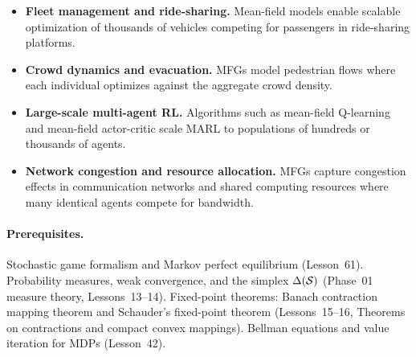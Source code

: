 \documentclass[11pt,a4paper]{article}
\begin{document}
\begin{rlconnection}[title={Why Mean-Field Games Matter for RL/ML}]
\begin{itemize}[nosep]
  \item \textbf{Fleet management and ride-sharing.}  Mean-field
    models enable scalable optimization of thousands of vehicles
    competing for passengers in ride-sharing platforms.
  \item \textbf{Crowd dynamics and evacuation.}  MFGs model
    pedestrian flows where each individual optimizes against the
    aggregate crowd density.
  \item \textbf{Large-scale multi-agent RL.}  Algorithms such as
    mean-field Q-learning \citep{yang2018} and mean-field
    actor-critic \citep{gu2021} scale MARL to populations of
    hundreds or thousands of agents.
  \item \textbf{Network congestion and resource allocation.}
    MFGs capture congestion effects in communication networks
    and shared computing resources where many identical agents
    compete for bandwidth.
\end{itemize}
\end{rlconnection}

\paragraph{Prerequisites.}
Stochastic game formalism and Markov perfect equilibrium (Lesson~61).
Probability measures, weak convergence, and the simplex
$\Delta(\mathcal{S})$ (Phase~01 measure theory, Lessons~13--14).
Fixed-point theorems: Banach contraction mapping theorem and
Schauder's fixed-point theorem (Lessons~15--16, Theorems on
contractions and compact convex mappings).  Bellman equations and
value iteration for MDPs (Lesson~42).
\end{document}
